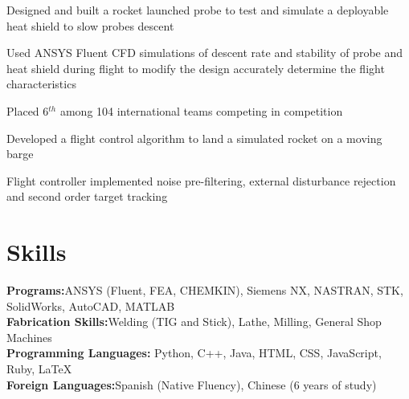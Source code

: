 \documentclass[letterpaper,11pt]{cv_format}
\begin{document}
\begin{c_itemize}
    \item Designed and built a rocket launched probe to test and simulate a deployable heat shield to slow probes descent 
    \item Used ANSYS Fluent CFD simulations of descent rate and stability of probe and heat shield during flight to modify the design accurately determine the flight characteristics
    \item Placed 6$^{th}$ among 104 international teams competing in competition
\end{c_itemize}

\begin{c_itemize}
    \item Developed a flight control algorithm to land a simulated rocket on a moving barge
    \item Flight controller implemented noise pre-filtering, external disturbance rejection and second order target tracking
\end{c_itemize}


\section{Skills}
\textbf{Programs:}ANSYS (Fluent, FEA, CHEMKIN), Siemens NX, NASTRAN, STK, SolidWorks, AutoCAD, MATLAB \\
\textbf{Fabrication Skills:}Welding (TIG and Stick), Lathe, Milling, General Shop Machines\\
\textbf{Programming Languages:} Python, C++, Java, HTML, CSS,  JavaScript, Ruby, \LaTeX\\
\textbf{Foreign Languages:}Spanish (Native Fluency), Chinese (6 years of study)
\end{document}
